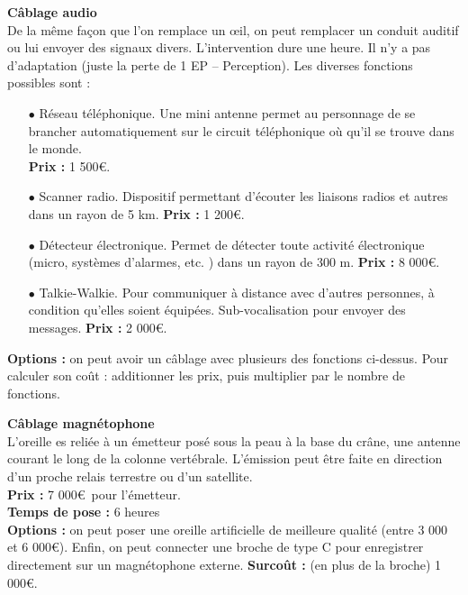 \documentclass[11pt,twoside,a4paper]{article}
\begin{document}
\begin{multicols*}{2}
\textbf{C{\^a}blage audio}~\\
De la m{\^e}me fa\c{c}on que l'on remplace un \oe il, on peut remplacer un conduit auditif ou lui envoyer des signaux divers. L'intervention dure une heure. Il n'y a pas d'adaptation (juste la perte de 1 EP -- Perception). Les diverses fonctions possibles sont : %
\begin{itemize}
	\footnotesize
	\item[$\bullet$] R{\'e}seau t{\'e}l{\'e}phonique. Une mini antenne permet au personnage de se brancher automatiquement sur le circuit t{\'e}l{\'e}phonique o{\`u} qu'il se trouve dans le monde. ~\\
		\textbf{Prix : } 1 500\euro . 
	\item[$\bullet$] Scanner radio. Dispositif permettant d'{\'e}couter les liaisons radios et autres dans un rayon de 5 km. \textbf{Prix : } 1 200\euro . 
	\item[$\bullet$] D{\'e}tecteur {\'e}lectronique. Permet de d{\'e}tecter toute activit{\'e} {\'e}lectronique (micro, syst{\`e}mes d'alarmes, etc. ) dans un rayon de 300 m. \textbf{Prix : } 8 000\euro . 
	\item[$\bullet$] Talkie-Walkie. Pour communiquer {\`a} distance avec d'autres personnes, {\`a} condition qu'elles soient {\'e}quip{\'e}es. Sub-vocalisation pour envoyer des messages. \textbf{Prix : } 2 000\euro . 
\end{itemize}
{\small 
	\textbf{Options : }on peut avoir un c{\^a}blage avec plusieurs des fonctions ci-dessus. Pour calculer son co{\^u}t : additionner les prix, puis multiplier par le nombre de fonctions. ~\\
} %

\textbf{C{\^a}blage magn{\'e}tophone}~\\
	L'oreille es reli{\'e}e {\`a} un {\'e}metteur pos{\'e} sous la peau {\`a} la base du cr{\^a}ne, une antenne courant le long de la colonne vert{\'e}brale. L'{\'e}mission peut {\^e}tre faite en direction d'un proche relais terrestre ou d'un satellite. ~\\ 
{\small 
	\textbf{Prix : }7 000\euro ~pour l'{\'e}metteur. ~\\
	\textbf{Temps de pose : }6 heures~\\
	\textbf{Options : }on peut poser une oreille artificielle de meilleure qualit{\'e} (entre 3 000 et 6 000\euro ). Enfin, on peut connecter une broche de type C pour enregistrer directement sur un magn{\'e}tophone externe. \textbf{Surco{\^u}t : }(en plus de la broche) 1 000\euro . ~\\
} %


\end{multicols*}
\end{document}
